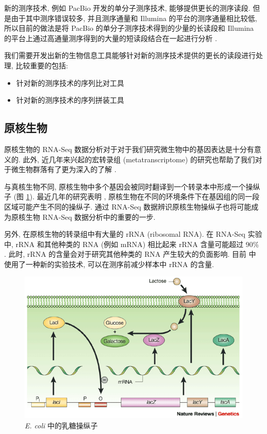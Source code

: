 新的测序技术, 例如 PacBio 开发的单分子测序技术, 能够提供更长的测序读段. 
但是由于其中测序错误较多, 并且测序通量和 Illumina 的平台的测序通量相比较低, 
所以目前的做法是将 PacBio 的单分子测序技术得到的少量的长读段和 Illumina 
的平台上通过高通量测序得到的大量的短读段结合在一起进行分析 \cite{hybrid.rna.seq.2012}. 

我们需要开发出新的生物信息工具能够针对新的测序技术提供的更长的读段进行处理, 
比较重要的包括: 
\begin{itemize}
\item 针对新的测序技术的序列比对工具

\item 针对新的测序技术的序列拼装工具
\end{itemize}

\subsection{原核生物}
原核生物的 RNA-Seq 数据分析对于对于我们研究微生物中的基因表达是十分有意义的. 
此外, 近几年来兴起的宏转录组 (metatranscriptome) 的研究也帮助了我们对于微生物群落有了更为深入的了解
\cite{gilbert2008detection, urich2008simultaneous, gifford2010quantitative, 
helbling2011activity, mason2012metagenome, huson2011integrative, 
lesniewski2012metatranscriptome}. 

\nocite{sorek2009prokaryotic}

与真核生物不同, 原核生物中多个基因会被同时翻译到一个转录本中形成一个操纵子 
(图 \ref{e.coli.lactose.operon}). 
最近几年的研究表明 \cite{MarcGuell11272009, koide2009prevalence}, 
原核生物在不同的环境条件下在基因组的同一段区域可能产生不同的操纵子. 
通过 RNA-Seq 数据辨识原核生物操纵子也将可能成为原核生物 RNA-Seq 数据分析中的重要的一步. 

另外, 在原核生物的转录组中有大量的 rRNA (ribosomal RNA).  
在 RNA-Seq 实验中, 
rRNA 和其他种类的 RNA (例如 mRNA) 相比起来 rRNA 含量可能超过 
90\% \cite{giannoukos2012efficient}. 
此时, rRNA 的含量会对于研究其他种类的 RNA 产生较大的负面影响. 
目前  中使用了一种新的实验技术, 
可以在测序前减少样本中 rRNA 的含量. 

\begin{figure}[!t]
\centering
\includegraphics[width=\textwidth]{figures/disc/e-coli-lactose-operon.png}
\caption{\textit{E. coli} 中的乳糖操纵子 \cite{shuman2003art}}
\label{e.coli.lactose.operon}
\end{figure}

